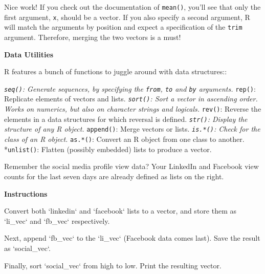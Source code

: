 \documentclass[]{article}
\newcommand{\hlstr}[1]{\textcolor[rgb]{0.251,0.627,0.251}{#1}}%
\newcommand{\hlstd}[1]{\textcolor[rgb]{0.251,0.251,0.251}{#1}}%
\newcommand{\hlkwc}[1]{\textcolor[rgb]{0.251,0.251,0.251}{#1}}%
\newenvironment{Shaded}{\begin{myshaded}}{\end{myshaded}}
\newcommand{\DataTypeTok}[1]{\hlkwc{#1}}
\newcommand{\StringTok}[1]{\hlstr{#1}}
\newcommand{\NormalTok}[1]{\hlstd{#1}}
\begin{document}
Nice work! If you check out the documentation of \texttt{mean()}, you'll
see that only the first argument, \texttt{x}, should be a vector. If you
also specify a second argument, R will match the arguments by position
and expect a specification of the \texttt{trim} argument. Therefore,
merging the two vectors is a must!

\textbf{Data Utilities}

R features a bunch of functions to juggle around with data structures::

\emph{\texttt{seq()}: Generate sequences, by specifying the
\texttt{from}, \texttt{to} and \texttt{by} arguments. }\texttt{rep()}:
Replicate elements of vectors and lists. \emph{\texttt{sort()}: Sort a
vector in ascending order. Works on numerics, but also on character
strings and logicals. }\texttt{rev()}: Reverse the elements in a data
structures for which reversal is defined. \emph{\texttt{str()}: Display
the structure of any R object. }\texttt{append()}: Merge vectors or
lists. \emph{\texttt{is.*()}: Check for the class of an R object.
}\texttt{as.*()}: Convert an R object from one class to another.
*\texttt{unlist()}: Flatten (possibly embedded) lists to produce a
vector.

Remember the social media profile view data? Your LinkedIn and Facebook
view counts for the last seven days are already defined as lists on the
right.

\textbf{Instructions}

\begin{Shaded}
\begin{Highlighting}[]
\OperatorTok{*}\StringTok{ }\NormalTok{Convert both }\StringTok{`}\DataTypeTok{linkedin}\StringTok{`}\NormalTok{ and }\StringTok{`}\DataTypeTok{facebook}\StringTok{`}\NormalTok{ lists to a vector, and store them as }\StringTok{`}\DataTypeTok{li_vec}\StringTok{`}\NormalTok{ and }\StringTok{`}\DataTypeTok{fb_vec}\StringTok{`}\NormalTok{ respectively.}

\OperatorTok{*}\NormalTok{Next, append }\StringTok{`}\DataTypeTok{fb_vec}\StringTok{`}\NormalTok{ to the }\StringTok{`}\DataTypeTok{li_vec}\StringTok{`}\NormalTok{ (Facebook data comes last). Save the result as }\StringTok{`}\DataTypeTok{social_vec}\StringTok{`}\NormalTok{.}

\OperatorTok{*}\NormalTok{Finally, sort }\StringTok{`}\DataTypeTok{social_vec}\StringTok{`}\NormalTok{ from high to low. Print the resulting vector.}
\end{Highlighting}
\end{Shaded}
\end{document}
